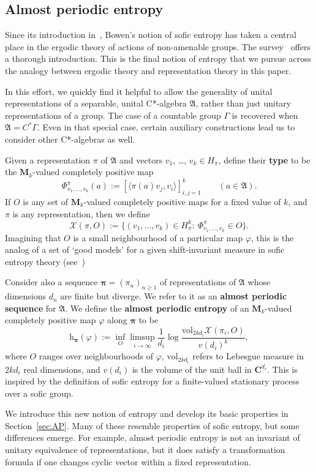 \documentclass[12pt,a4paper]{article}
\numberwithin{equation}{section}
\theoremstyle{remark}
\newcommand{\bbC}{\mathbf{C}}
\newcommand{\rmM}{\mathbf{M}}
\newcommand{\rmh}{\mathrm{h}}
\newcommand{\X}{\mathcal{X}}
\newcommand{\A}{\mathfrak{A}}
\newcommand{\G}{\Gamma}
\renewcommand{\phi}{\varphi}
\newcommand{\bspi}{\boldsymbol{\pi}}
\newcommand{\vol}{\mathrm{vol}}
\begin{document}
\subsection{Almost periodic entropy}

Since its introduction in~\cite{Bowen10}, Bowen's notion of sofic entropy has taken a central place in the ergodic theory of actions of non-amenable groups. The survey~\cite{Bowen--survey} offers a thorough introduction.  This is the final notion of entropy that we pursue across the analogy between ergodic theory and representation theory in this paper. 

In this effort, we quickly find it helpful to allow the generality of unital representations of a separable, unital C*-algebra $\A$, rather than just unitary representations of a group.  The case of a countable group $\G$ is recovered when $\A = C^\ast \G$.  Even in that special case, certain auxiliary constructions lead us to consider other C*-algebras as well.

Given a representation $\pi$ of $\A$ and vectors $v_1$, \dots, $v_k \in H_\pi$, define their \textbf{type} to be the $\rmM_k$-valued completely positive map
\[\Phi^\pi_{v_1,\dots,v_k}(a) := [\langle \pi(a)v_j,v_i\rangle]_{i,j =1}^k \qquad (a \in \A).\]
If $O$ is any set of $\rmM_k$-valued completely positive maps for a fixed value of $k$, and $\pi$ is any representation, then we define
\[\X(\pi,O) := \{(v_1,\dots,v_k) \in H_\pi^k:\ \Phi^\pi_{v_1,\dots,v_k} \in O\}.\]
Imagining that $O$ is a small neighbourhood of a particular map $\phi$, this is the analog of a set of `good models' for a given shift-invariant measure in sofic entropy theory (see~\cite{Bowen--survey})

Consider also a sequence $\bspi = (\pi_n)_{n\ge 1}$ of representations of $\A$ whose dimensions $d_n$ are finite but diverge.  We refer to it as an \textbf{almost periodic sequence} for $\A$.  We define the \textbf{almost periodic entropy} of an $\rmM_k$-valued completely positive map $\phi$ along $\bspi$ to be
\[\rmh_{\bspi}(\phi) := \inf_O \limsup_{i\to \infty}\frac{1}{d_i}\log \frac{\vol_{2kd_i}\X(\pi_i,O)}{v(d_i)^k},\]
where $O$ ranges over neighbourhoods of $\phi$, $\vol_{2kd_i}$ refers to Lebesgue measure in $2kd_i$ real dimensions, and $v(d_i)$ is the volume of the unit ball in $\bbC^{d_i}$.  This is inspired by the definition of sofic entropy for a finite-valued stationary process over a sofic group.

We introduce this new notion of entropy and develop its basic properties in Section~\ref{sec:AP}.  Many of these resemble properties of sofic entropy, but some differences emerge.  For example, almost periodic entropy is not an invariant of unitary equivalence of representations, but it does satisfy a transformation formula if one changes cyclic vector within a fixed representation.
\end{document}
